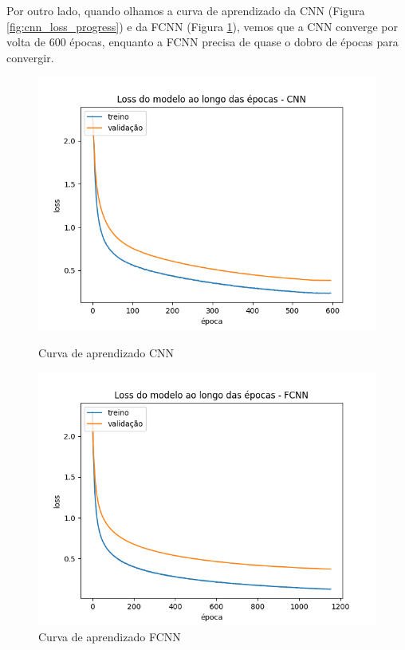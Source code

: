 \documentclass[12pt]{article}
\begin{document}
Por outro lado, quando olhamos a curva de aprendizado da CNN (Figura \ref{fig:cnn_loss_progress}) e da FCNN (Figura \ref{fig:fcnn_loss_progress}), vemos que a CNN converge por volta de 600 épocas, enquanto a FCNN precisa de quase o dobro de épocas para convergir.

\begin{figure}[H]
\centering
\begin{minipage}{0.5\textwidth}
  \centering
  \includegraphics[width=\textwidth]{../images/results_plt/cnn_loss_progress.png}
  \caption{Curva de aprendizado CNN}
  \label{fig:cnn_loss_progress}
\end{minipage}%
\hfill
\begin{minipage}{0.5\textwidth}
  \centering
  \includegraphics[width=\textwidth]{../images/results_plt/fcnn_loss_progress.png}
  \caption{Curva de aprendizado FCNN}
\label{fig:fcnn_loss_progress}
\end{minipage}
\end{figure}
\end{document}
